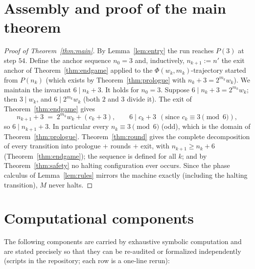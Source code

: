 \documentclass[11pt]{amsart}
\theoremstyle{definition}
\begin{document}
\section{Assembly and proof of the main theorem}\label{s:assembly}

\begin{proof}[Proof of Theorem~\ref{thm:main}]
By Lemma~\ref{lem:entry} the run reaches $P(3)$ at step $54$. Define the
anchor sequence $n_0=3$ and, inductively, $n_{k+1}:=n'$ the exit anchor of
Theorem~\ref{thm:endgame} applied to the $\Phi(w_k,m_k)$-trajectory started
from $P(n_k)$ (which exists by Theorem~\ref{thm:prologue} with
$n_k+3=2^{m_k}w_k$). We maintain the invariant $6\mid n_k+3$. It holds
for $n_0=3$. Suppose $6\mid n_k+3=2^{m_k}w_k$; then $3\mid w_k$, and
$6\mid 2^{m_k}w_k$ (both $2$ and $3$ divide it). The exit of
Theorem~\ref{thm:endgame} gives
\[
n_{k+1}+3 \;=\; 2^{m_k}w_k+(c_k+3),\qquad 6\mid c_k+3\ \ (\text{since } c_k\equiv3\pmod6),
\]
so $6\mid n_{k+1}+3$. In particular every $n_k\equiv3\pmod6$ (odd), which
is the domain of Theorem~\ref{thm:prologue}.
Theorem~\ref{thm:round} gives the complete decomposition of every
transition into prologue $+$ rounds $+$ exit, with
$n_{k+1}\ge n_k+6$ (Theorem~\ref{thm:endgame}); the sequence is defined for
all $k$; and by Theorem~\ref{thm:safety} no halting configuration ever
occurs. Since the phase calculus of Lemma~\ref{lem:rules} mirrors the
machine exactly (including the halting transition), $M$ never halts.
\end{proof}

\section{Computational components}\label{s:comp}

The following components are carried by exhaustive symbolic computation and
are stated precisely so that they can be re-audited or formalized
independently (scripts in the repository; each row is a one-line rerun):
\end{document}
